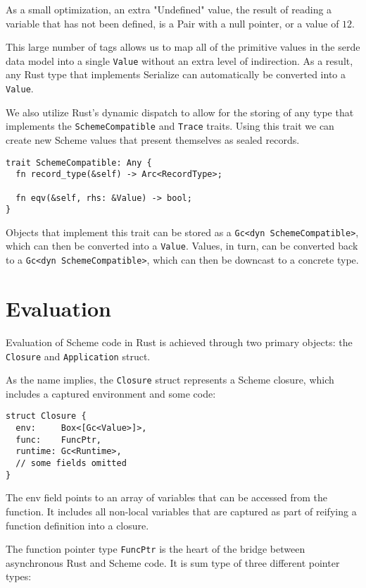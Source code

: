 \documentclass[sigplan,authordraft]{acmart}
\begin{document}
As a small optimization, an extra "Undefined" value, the result of reading a
variable that has not been defined, is a Pair with a null pointer, or a value
of $12$.

This large number of tags allows us to map all of the primitive values in the
serde data model\cite{serde} into a single \texttt{Value} without an extra level of
indirection. As a result, any Rust type that implements Serialize can
automatically be converted into a \texttt{Value}.

We also utilize Rust's dynamic dispatch to allow for the storing of any type that
implements the \texttt{SchemeCompatible} and \texttt{Trace} traits. Using this
trait we can create new Scheme values that present themselves as sealed records.

\begin{verbatim}
trait SchemeCompatible: Any {
  fn record_type(&self) -> Arc<RecordType>;

  fn eqv(&self, rhs: &Value) -> bool;
}
\end{verbatim}

Objects that implement this trait can be stored as a \texttt{Gc<dyn SchemeCompatible>},
which can then be converted into a \texttt{Value}. Values, in turn, can be converted
back to a \texttt{Gc<dyn SchemeCompatible>}, which can then be downcast to a concrete
type.

\section{Evaluation}

Evaluation of Scheme code in Rust is achieved through two primary objects: the
\texttt{Closure} and \texttt{Application} struct.

As the name implies, the \texttt{Closure} struct represents a Scheme closure,
which includes a captured environment and some code:

\begin{verbatim}
struct Closure {
  env:     Box<[Gc<Value>]>,
  func:    FuncPtr,
  runtime: Gc<Runtime>,
  // some fields omitted
}
\end{verbatim}

The env field points to an array of variables that can be accessed from the
function. It includes all non-local variables that are captured as part of
reifying a function definition into a closure.

The function pointer type \texttt{FuncPtr} is the heart of the bridge between
asynchronous Rust and Scheme code. It is sum type of three different pointer
types:
\end{document}
